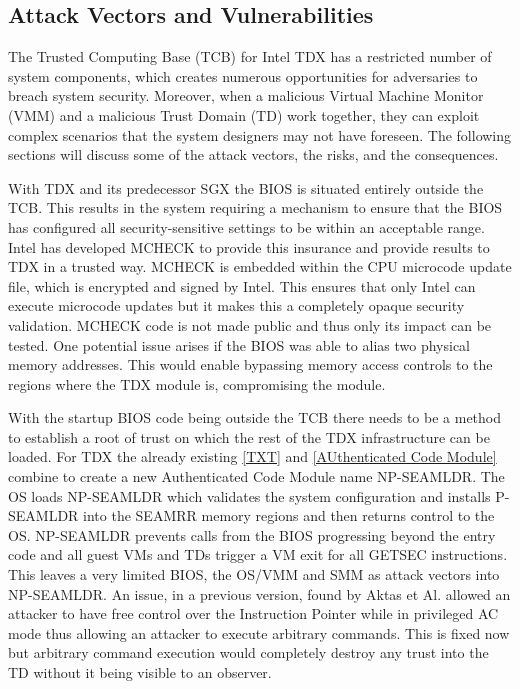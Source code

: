 \subsection{Attack Vectors and Vulnerabilities}


The Trusted Computing Base (TCB) for Intel TDX has a restricted number of system components, which creates numerous opportunities for adversaries to breach system security. Moreover, when a malicious Virtual Machine Monitor (VMM) and a malicious Trust Domain (TD) work together, they can exploit complex scenarios that the system designers may not have foreseen. The following sections will discuss some of the attack vectors, the risks, and the consequences.


With TDX and its predecessor SGX the BIOS is situated entirely outside the TCB. This results in the system requiring a mechanism to ensure that the BIOS has configured all security-sensitive settings to be within an acceptable range. Intel has developed MCHECK to provide this insurance and provide results to TDX in a trusted way. MCHECK is embedded within the CPU microcode update file, which is encrypted and signed by Intel. This ensures that only Intel can execute microcode updates but it makes this a completely opaque security validation. MCHECK code is not made public and thus only its impact can be tested. One potential issue arises if the BIOS was able to alias two physical memory addresses. This would enable bypassing memory access controls to the regions where the TDX module is, compromising the module. 


With the startup BIOS code being outside the \gls{TCB} there needs to be a method to establish a root of trust on which the rest of the TDX infrastructure can be loaded. For TDX the already existing \ref{TXT} and \ref{AUthenticated Code Module} combine to create a new Authenticated Code Module name \Gls{NP-SEAMLDR}. The OS loads \Gls{NP-SEAMLDR} which validates the system configuration and installs \Gls{P-SEAMLDR} into the \Gls{SEAMRR} memory regions and then returns control to the OS. \Gls{NP-SEAMLDR} prevents calls from the BIOS progressing beyond the entry code and all guest VMs and TDs trigger a VM exit for all \Gls{GETSEC} instructions. This leaves a very limited BIOS, the OS/VMM and SMM as attack vectors into \Gls{NP-SEAMLDR}. An issue, in a previous version, found by Aktas et Al. allowed an attacker to have free control over the Instruction Pointer while in privileged AC mode thus allowing an attacker to execute arbitrary commands\cite{aktas_intel_nodate}. This is fixed now but arbitrary command execution would completely destroy any trust into the \Gls{TD} without it being visible to an observer.

